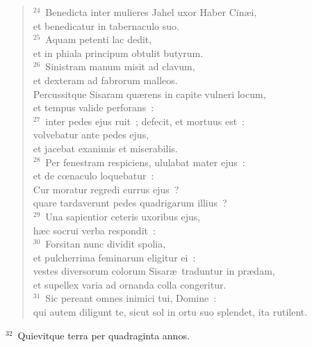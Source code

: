 \begin{flushleft}\begin{verse}${}^{24}$~Benedicta inter mulieres Jahel uxor Haber Cin\ae i,\\ et benedicatur in tabernaculo suo.\\
${}^{25}$~Aquam petenti lac dedit,\\ et in phiala principum obtulit butyrum.\\
${}^{26}$~Sinistram manum misit ad clavum,\\ et dexteram ad fabrorum malleos.\\ Percussitque Sisaram qu\ae rens in capite vulneri locum,\\ et tempus valide perforans~:\\
${}^{27}$~inter pedes ejus ruit~; defecit, et mortuus est~:\\ volvebatur ante pedes ejus,\\ et jacebat exanimis et miserabilis.\\
${}^{28}$~Per fenestram respiciens, ululabat mater ejus~:\\ et de cœnaculo loquebatur~:\\ Cur moratur regredi currus ejus~?\\ quare tardaverunt pedes quadrigarum illius~?\\
${}^{29}$~Una sapientior ceteris uxoribus ejus,\\ h\ae c socrui verba respondit~:\\
${}^{30}$~Forsitan nunc dividit spolia,\\ et pulcherrima feminarum eligitur ei~:\\ vestes diversorum colorum Sisar\ae\ traduntur in pr\ae dam,\\ et supellex varia ad ornanda colla congeritur.\\
${}^{31}$~Sic pereant omnes inimici tui, Domine~:\\ qui autem diligunt te, sicut sol in ortu suo splendet, ita rutilent.\end{verse}\end{flushleft}


${}^{32}$~Quievitque terra per quadraginta annos.

